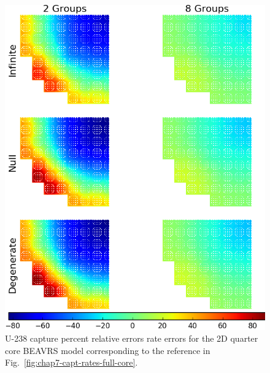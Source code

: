 \begin{appendices}
\begin{figure}[h!]
\centering
\includegraphics[width=\linewidth]{figures/quantification/appendix/full-core/capt-err}
\vspace{2mm}
\caption[U-238 capture rate errors for the 2D quarter core \ac{BEAVRS} model]{U-238 capture percent relative errors rate errors for the 2D quarter core \ac{BEAVRS} model corresponding to the reference in Fig.~\ref{fig:chap7-capt-rates-full-core}.}
\label{fig:quantify-full-core-capt-err}
\end{figure}

\clearpage



\end{appendices}
